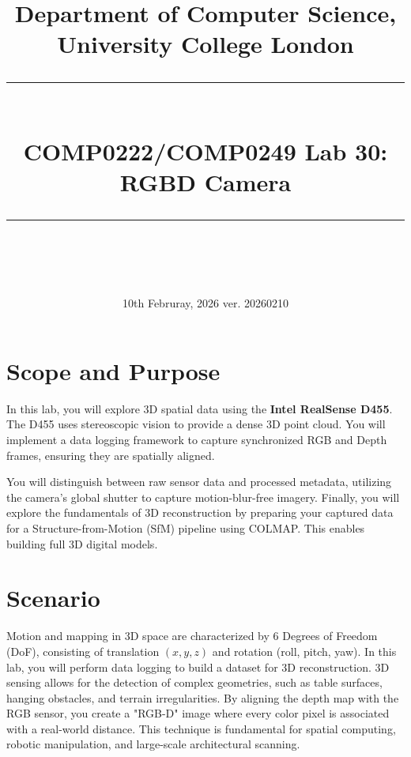 \documentclass{article}
\newcommand{\horrule}[1]{\rule{\linewidth}{#1}} %
\begin{document}
\title{
\normalfont \normalsize
{Department of Computer Science, University College London} \\ [25pt] %
\horrule{0.5pt} \\[0.4cm] %
\huge COMP0222/COMP0249 Lab 30: 
\\RGBD Camera\\ %
\horrule{2pt} \\[0.5cm] %
}
\date{\normalsize 10th Februray, 2026 ver. 20260210} %
\maketitle %

\newcommand{\ebe}{\texttt{ebe}}

\vspace{25 mm}
\section{Scope and Purpose} 

In this lab, you will explore 3D spatial data using the \textbf{Intel RealSense D455}. The D455 uses stereoscopic vision to provide a dense 3D point cloud. You will implement a data logging framework to capture synchronized RGB and Depth frames, ensuring they are spatially aligned.

You will distinguish between raw sensor data and processed metadata, utilizing the camera's global shutter to capture motion-blur-free imagery. Finally, you will explore the fundamentals of 3D reconstruction by preparing your captured data for a Structure-from-Motion (SfM) pipeline using COLMAP. This enables building full 3D digital models.



\section{Scenario}

Motion and mapping in 3D space are characterized by 6 Degrees of Freedom (DoF), consisting of translation $(x, y, z)$ and rotation (roll, pitch, yaw). In this lab, you will perform data logging to build a dataset for 3D reconstruction. 3D sensing allows for the detection of complex geometries, such as table surfaces, hanging obstacles, and terrain irregularities. By aligning the depth map with the RGB sensor, you create a "RGB-D" image where every color pixel is associated with a real-world distance. This technique is fundamental for spatial computing, robotic manipulation, and large-scale architectural scanning.
\end{document}
